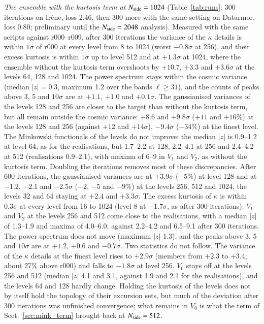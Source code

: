 \documentclass{aa}
\newcommand{\nside}{N_{\rm side}}
\begin{document}
\emph{The ensemble with the kurtosis term at $\nside=1024$} (Table~\ref{tab:runs}: 300 iterations on Ir\`ene, loss 2.46, then 300 more with the same setting on Datarmor, loss 0.80; preliminary until the $\nside=2048$ analysis). Measured with the same scripts against r000--r009, after 300 iterations the variance of the $\kappa$ details is within $1\sigma$ of r000 at every level from 8 to 1024 (worst $-0.8\sigma$ at 256), and their excess kurtosis is within $1\sigma$ up to level 512 and at $+1.3\sigma$ at 1024, where the ensemble without the kurtosis term overshoots by $+10.7$, $+3.3$ and $+3.6\sigma$ at the levels 64, 128 and 1024. The power spectrum stays within the cosmic variance (median $|z|=0.3$, maximum 1.2 over the bands $\ell\geq31$), and the counts of peaks above 3, 5 and $10\sigma$ are at $+1.1$, $+1.0$ and $+0.1\sigma$. The gaussianised variances of the levels 128 and 256 are closer to the target than without the kurtosis term, but all remain outside the cosmic variance: $+8.6$ and $+9.8\sigma$ ($+11$ and $+16\%$) at the levels 128 and 256 (against $+12$ and $+14\sigma$), $-9.4\sigma$ ($-34\%$) at the finest level. The Minkowski functionals of the levels do not improve: the median $|z|$ is 0.9--1.2 at level 64, as for the realisations, but 1.7--2.2 at 128, 2.2--4.1 at 256 and 2.4--4.2 at 512 (realisations 0.9--2.1), with maxima of 6--9 in $V_1$ and $V_2$, as without the kurtosis term. Doubling the iterations removes most of these discrepancies. After 600 iterations, the gaussianised variances are at $+3.9\sigma$ ($+5\%$) at level 128 and at $-1.2$, $-2.1$ and $-2.5\sigma$ ($-2$, $-5$ and $-9\%$) at the levels 256, 512 and 1024, the levels 32 and 64 staying at $+2.4$ and $+3.3\sigma$. The excess kurtosis of $\kappa$ is within $0.3\sigma$ at every level from 16 to 1024 (level 8 at $-1.7\sigma$, as after 300 iterations). $V_1$ and $V_2$ at the levels 256 and 512 come close to the realisations, with a median $|z|$ of 1.3--1.9 and maxima of 4.0--6.0, against 2.2--4.2 and 6.5--9.1 after 300 iterations. The power spectrum does not move (maximum $|z|$ 1.3), and the peaks above 3, 5 and $10\sigma$ are at $+1.2$, $+0.6$ and $-0.7\sigma$. Two statistics do not follow. The variance of the $\kappa$ details at the finest level rises to $+2.9\sigma$ (members from $+2.3$ to $+3.4$; about 27\% above r000) and falls to $-1.8\sigma$ at level 256. $V_0$ stays off at the levels 256 and 512 (median $|z|$ 4.1 and 3.1, against 1.9 and 2.1 for the realisations), and the levels 64 and 128 hardly change. Holding the kurtosis of the levels does not by itself hold the topology of their excursion sets, but much of the deviation after 300 iterations was unfinished convergence; what remains in $V_0$ is what the term of Sect.~\ref{sec:mink_term} brought back at $\nside=512$. %
\end{document}
